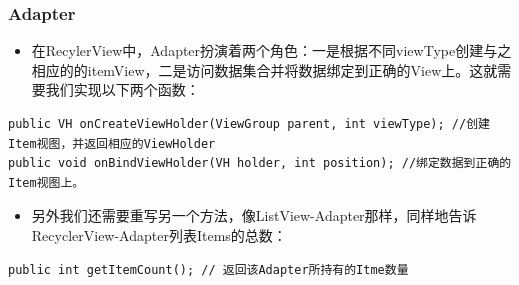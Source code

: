 \documentclass[9pt, b5paper]{article}
\begin{document}
\subsubsection{Adapter}
\label{sec-5-3-1}
\begin{itemize}
\item 在RecylerView中，Adapter扮演着两个角色：一是根据不同viewType创建与之相应的的itemView，二是访问数据集合并将数据绑定到正确的View上。这就需要我们实现以下两个函数：
\end{itemize}
\begin{verbatim}
public VH onCreateViewHolder(ViewGroup parent, int viewType); //创建Item视图，并返回相应的ViewHolder
public void onBindViewHolder(VH holder, int position); //绑定数据到正确的Item视图上。
\end{verbatim}
\begin{itemize}
\item 另外我们还需要重写另一个方法，像ListView-Adapter那样，同样地告诉RecyclerView-Adapter列表Items的总数：
\end{itemize}
\begin{verbatim}
public int getItemCount(); // 返回该Adapter所持有的Itme数量
\end{verbatim}
\end{document}
